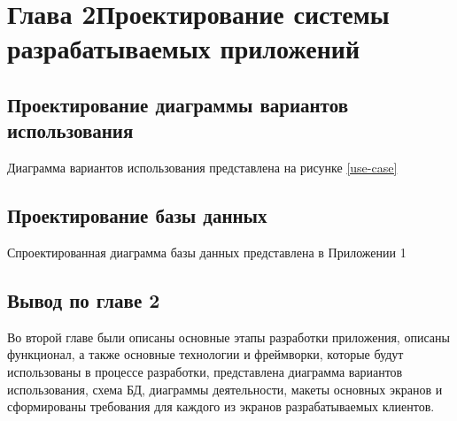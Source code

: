 \documentclass[14pt,a4paper]{scrartcl}
\begin{document}
    

    

    \tableofcontents

%    
    
    

    \section[Глава 2 Проектирование системы разрабатываемых приложений]{Глава 2\break Проектирование системы разрабатываемых приложений}
    \label{sec:charpter-2-designing}

    
    
    

    \subsection{Проектирование диаграммы вариантов использования}\label{subsec:design-use-case}\indent

    Диаграмма вариантов использования представлена на рисунке \ref{use-case}

    \subsection{Проектирование базы данных}\label{subsec:design-db}\indent

    Спроектированная диаграмма базы данных представлена в Приложении 1

    
    
    
    

    \subsection{Вывод по главе 2}\label{subsec:2-conclusion}\indent

    Во второй главе были описаны основные этапы разработки приложения, описаны функционал, а также основные технологии и фреймворки, которые будут использованы в процессе разработки, представлена диаграмма вариантов использования, схема БД, диаграммы деятельности, макеты основных экранов и сформированы требования для каждого из экранов разрабатываемых клиентов.
\end{document}
